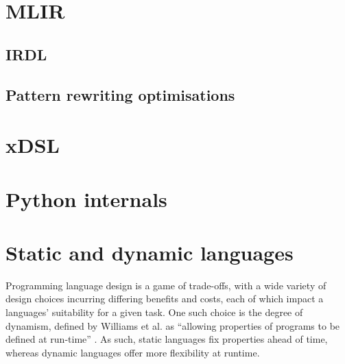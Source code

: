 \section{MLIR}
\label{sec:mlir}

\subsection{IRDL}
\label{ssec:irdl}

\subsection{Pattern rewriting optimisations}
\label{ssec:pattern-rewriting}



\section{xDSL}
\label{sec:xdsl}









\section{Python internals}
\label{sec:python-internals}










\section{Static and dynamic languages}
\label{sec:static-dynamic-languages}

Programming language design is a game of trade-offs, with a wide variety of design choices incurring differing benefits and costs, each of which impact a languages' suitability for a given task.
One such choice is the degree of dynamism, defined by Williams et al. as ``allowing properties of programs to be defined at run-time'' \cite{williamsDynamicInterpretationDynamic2010}. As such, static languages fix properties ahead of time, whereas dynamic languages offer more flexibility at runtime.

